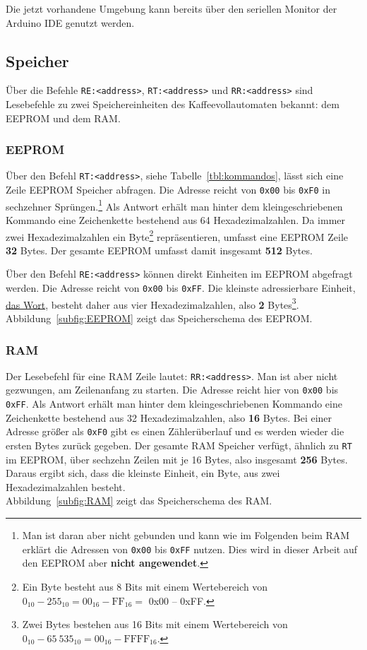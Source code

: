 Die jetzt vorhandene Umgebung kann bereits über den seriellen Monitor der Arduino \ac{IDE} genutzt werden.

\subsection{Speicher}
Über die Befehle \texttt{RE:<address>}, \texttt{RT:<address>} und \texttt{RR:<address>} sind Lesebefehle zu zwei Speichereinheiten des Kaffeevollautomaten bekannt: dem \acf{EEPROM} und dem \acf{RAM}.

\subsubsection{EEPROM}\label{subsubsec:SpeicherDesKaffeevollautomatenEEPROM}
Über den Befehl \texttt{RT:<address>}, siehe Tabelle~\ref{tbl:kommandos}, lässt sich eine Zeile \ac{EEPROM} Speicher abfragen.
Die Adresse reicht von \texttt{0x00} bis \texttt{0xF0} in sechzehner Sprüngen.\footnote{Man ist daran aber nicht gebunden und kann wie im Folgenden beim \ac{RAM} erklärt die Adressen von \texttt{0x00} bis \texttt{0xFF} nutzen. Dies wird in dieser Arbeit auf den \ac{EEPROM} aber \textbf{nicht angewendet}.}
Als Antwort erhält man hinter dem kleingeschriebenen Kommando eine Zeichenkette bestehend aus 64 Hexadezimalzahlen.
Da immer zwei Hexadezimalzahlen ein Byte\footnote{Ein Byte besteht aus 8 Bits mit einem Wertebereich von $0_{10}-255_{10} = 00_{16}-\text{FF}_{16} = $ 0x00 -- 0xFF.} repräsentieren, umfasst eine \ac{EEPROM} Zeile \textbf{32} Bytes.
Der gesamte \ac{EEPROM} umfasst damit insgesamt \textbf{512} Bytes.

Über den Befehl \texttt{RE:<address>} können direkt Einheiten im \ac{EEPROM} abgefragt werden. Die Adresse reicht von \texttt{0x00} bis \texttt{0xFF}.
Die kleinste adressierbare Einheit, \underline{das Wort}, besteht daher aus vier Hexadezimalzahlen, also \textbf{2} Bytes\footnote{Zwei Bytes bestehen aus 16 Bits mit einem Wertebereich von $0_{10}-65\:535_{10} = 00_{16}-\text{FFFF}_{16}$.}.\\
Abbildung~\ref{subfig:EEPROM} zeigt das Speicherschema des \ac{EEPROM}.

\subsubsection{RAM}\label{subsubsec:SpeicherDesKaffeevollautomatenRAM}
Der Lesebefehl für eine \ac{RAM} Zeile lautet: \texttt{RR:<address>}.
Man ist aber nicht gezwungen, am Zeilenanfang zu starten.
Die Adresse reicht hier von \texttt{0x00} bis \texttt{0xFF}.
Als Antwort erhält man hinter dem kleingeschriebenen Kommando eine Zeichenkette bestehend aus 32 Hexadezimalzahlen, also \textbf{16} Bytes.
Bei einer Adresse größer als \texttt{0xF0} gibt es einen Zählerüberlauf und es werden wieder die ersten Bytes zurück gegeben.
Der gesamte \ac{RAM} Speicher verfügt, ähnlich zu \texttt{RT} im \ac{EEPROM}, über sechzehn Zeilen mit je 16 Bytes, also insgesamt \textbf{256} Bytes.
Daraus ergibt sich, dass die kleinste Einheit, ein Byte, aus zwei Hexadezimalzahlen besteht.\\
Abbildung~\ref{subfig:RAM} zeigt das Speicherschema des \ac{RAM}.



